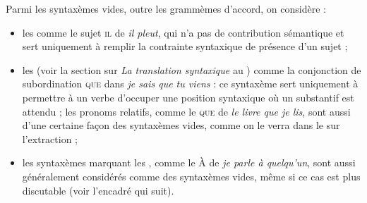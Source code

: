Parmi les syntaxèmes vides, outre les grammèmes d’accord, on considère :

\begin{itemize}
\item les  comme le sujet \textsc{il} de \textit{il pleut}, qui n’a pas de contribution sémantique et sert uniquement à remplir la contrainte syntaxique de présence d’un sujet ;
\item les  (voir la section sur \textit{La translation syntaxique} au ) comme la conjonction de subordination \textsc{que} dans \textit{je sais que tu viens} : ce syntaxème sert uniquement à permettre à un verbe d’occuper une position syntaxique où un substantif est attendu ; les pronoms relatifs, comme le \textsc{que} de \textit{le livre que je lis}, sont aussi d’une certaine façon des syntaxèmes vides, comme on le verra dans le  sur l’extraction ;
\item les syntaxèmes marquant les , comme le À de \textit{je parle à quelqu’un}, sont aussi généralement considérés comme des syntaxèmes vides, même si ce cas est plus discutable (voir l’encadré qui suit).
\end{itemize}

